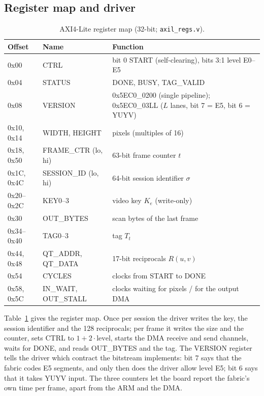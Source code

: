 \subsection{Register map and driver}\label{sec:regs}
\begin{table}[t]
\caption{AXI4-Lite register map (32-bit; \texttt{axil\_regs.v}).}
\label{tab:regs}
\centering\small\setlength{\tabcolsep}{3pt}
\begin{tabular}{lll}
\toprule
Offset & Name & Function \\
\midrule
0x00 & CTRL & bit 0 START (self-clearing), bits 3:1 level E0--E5 \\
0x04 & STATUS & DONE, BUSY, TAG\_VALID \\
0x08 & VERSION & 0x5EC0\_0200 (single pipeline); 0x5EC0\_03LL ($L$ lanes, bit 7 = E5, bit 6 = YUYV) \\
0x10, 0x14 & WIDTH, HEIGHT & pixels (multiples of 16) \\
0x18, 0x50 & FRAME\_CTR (lo, hi) & 63-bit frame counter $t$ \\
0x1C, 0x4C & SESSION\_ID (lo, hi) & 64-bit session identifier $\sigma$ \\
0x20--0x2C & KEY0--3 & video key $K_e$ (write-only) \\
0x30 & OUT\_BYTES & scan bytes of the last frame \\
0x34--0x40 & TAG0--3 & tag $T_t$ \\
0x44, 0x48 & QT\_ADDR, QT\_DATA & 17-bit reciprocals $R(u, v)$ \\
0x54 & CYCLES & clocks from START to DONE \\
0x58, 0x5C & IN\_WAIT, OUT\_STALL & clocks waiting for pixels / for the output DMA \\
\bottomrule
\end{tabular}
\end{table}
Table~\ref{tab:regs} gives the register map. Once per session the driver writes the key, the session identifier and the 128 reciprocals; per frame it writes the size and the counter, sets CTRL to $1 + 2 \cdot \text{level}$, starts the DMA receive and send channels, waits for DONE, and reads OUT\_BYTES and the tag. The VERSION register tells the driver which contract the bitstream implements: bit 7 says that the fabric codes E5 segments, and only then does the driver allow level E5; bit 6 says that it takes YUYV input. The three counters let the board report the fabric's own time per frame, apart from the ARM and the DMA.

